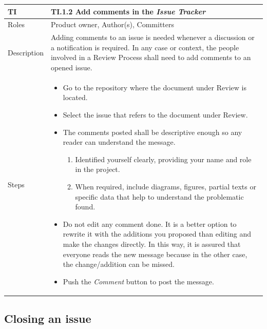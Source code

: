 \documentclass{template/openetcs_article}
\begin{document}
\begin{flushleft}
\tablefirsthead{}
\tablehead{}
\tabletail{}
\tablelasttail{}
\begin{supertabular}{|m{2cm}|m{13cm}|}
\hline
{}
TI & 
TI.1.2 Add comments in the {\it Issue Tracker}
\\\hline
Roles &
Product owner, Author(s), Committers
\\\hline
Description &
Adding comments to an issue is needed whenever a discussion or a notification is required. In any case or context, the people involved in a Review Process shall need to add comments to an opened issue.
\\\hline
Steps &
\begin{itemize}
\item Go to the repository where the document under Review is located.
\item Select the issue that refers to the document under Review.
\item The comments posted shall be descriptive enough so any reader can understand the message. 
\begin{enumerate}
\item Identified yourself clearly, providing your name and role in the project.
\item When required, include diagrams, figures, partial texts or specific data that help to understand the problematic found.
\end{enumerate}
\item Do not edit any comment done. It is a better option to rewrite it with the additions you proposed than editing and make the changes directly. In this way, it is assured that everyone reads the new message because in the other case, the change/addition can be missed.
\item Push the {\it Comment} button to post the message.
\end{itemize}

\\\hline
\end{supertabular}
\end{flushleft}

\subsection{Closing an issue}
\end{document}
